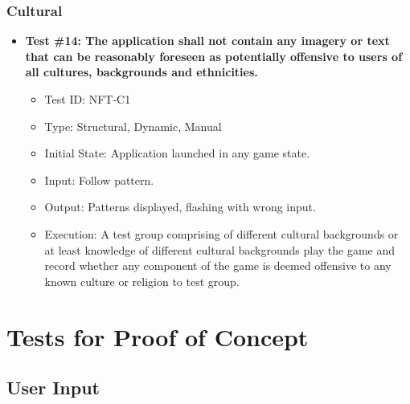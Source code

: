 \documentclass[12pt, titlepage]{article}
\begin{document}
\subsubsection{Cultural}
\begin{itemize}
\item \textbf{Test \#14: The application shall not contain any imagery or text that can be reasonably foreseen as potentially offensive to users of all cultures, backgrounds and ethnicities.}
\begin{itemize}
\item Test ID: NFT-C1
\item Type: Structural, Dynamic, Manual				
\item Initial State: Application launched in any game state.		
\item Input: Follow pattern.
\item Output: Patterns displayed, flashing with wrong input.		
\item Execution: A test group comprising of different cultural backgrounds or at least knowledge of different cultural backgrounds play the game and record whether any component of the game is deemed offensive to any known culture or religion to test group.
\end{itemize}
\end{itemize}


\section{Tests for Proof of Concept}

\subsection{User Input}
		
\end{document}
